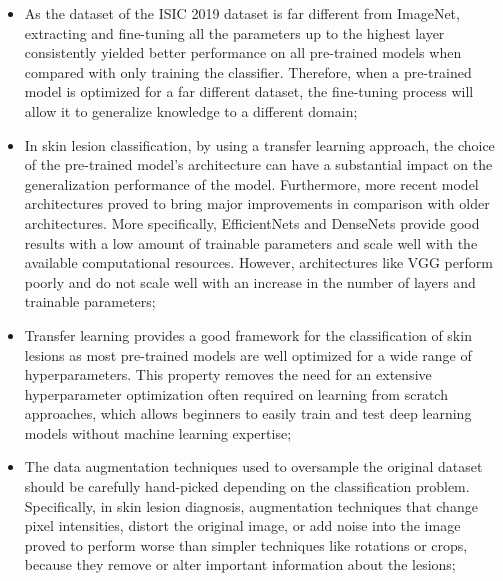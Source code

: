     \begin{itemize}
        \item As the dataset of the \ac{ISIC} 2019 dataset is far different from ImageNet, extracting and fine-tuning all the parameters up to the highest layer consistently yielded better performance on all pre-trained models when compared with only training the classifier. Therefore, when a pre-trained model is optimized for a far different dataset, the fine-tuning process will allow it to generalize knowledge to a different domain;
        
        \item In skin lesion classification, by using a transfer learning approach, the choice of the pre-trained model's architecture can have a substantial impact on the generalization performance of the model. Furthermore, more recent model architectures proved to bring major improvements in comparison with older architectures. More specifically, EfficientNets and DenseNets provide good results with a low amount of trainable parameters and scale well with the available computational resources. However, architectures like VGG perform poorly and do not scale well with an increase in the number of layers and trainable parameters;
    
        \item Transfer learning provides a good framework for the classification of skin lesions as most pre-trained models are well optimized for a wide range of hyperparameters. This property removes the need for an extensive hyperparameter optimization often required on learning from scratch approaches, which allows beginners to easily train and test deep learning models without machine learning expertise;    
        
        
        \item The data augmentation techniques used to oversample the original dataset should be carefully hand-picked depending on the classification problem. Specifically, in skin lesion diagnosis, augmentation techniques that change pixel intensities, distort the original image, or add noise into the image proved to perform worse than simpler techniques like rotations or crops, because they remove or alter important information about the lesions;
        

\end{itemize}
